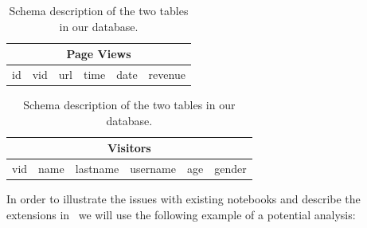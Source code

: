 \begin{table}
\begin{center}

\begin{tabular}{|c|c|c|c|c|c|}
\hline 
\multicolumn{6}{|c|}{Page Views} \\ 
\hline 
id & vid & url & time & date & revenue \\ 
\hline 
\end{tabular} 

\hfill

\begin{tabular}{|c|c|c|c|c|c|}
\hline 
\multicolumn{6}{|c|}{Visitors} \\ 
\hline 
vid & name & lastname & username & age & gender \\ 
\hline 
\end{tabular} 

\end{center}
\caption{Schema description of the two tables in our database.}
\label{tab:schema}
\end{table}


In order to illustrate the issues with existing notebooks and describe the extensions in \projname\, we will use the following example of a potential analysis:


